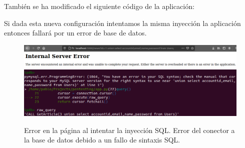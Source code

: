 \documentclass[a4paper,oneside]{article}
\begin{document}
\begin{enumerate}[label=\textbf{\alph*)}]
También se ha modificado el siguiente código de la aplicación:


Si dada esta nueva configuración intentamos la misma inyección la aplicación entonces fallará por un error de base de datos.

\begin{figure}[h!]
  \centering
  \includegraphics[scale=0.3]{images/nok.png}\\
  \vspace{1cm}
  \includegraphics[scale=0.5]{images/stored_procedure2.png}
  \caption{Error en la página al intentar la inyección SQL. Error del conector a la base de datos debido a un fallo de sintaxis SQL.}
  \label{fig:stored_procedure}
\end{figure}

\end{enumerate}
\end{document}
